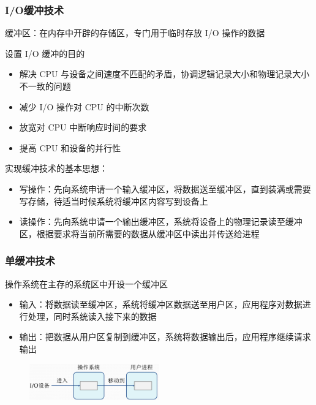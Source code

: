\documentclass[cs4size,a4paper,10pt]{ctexart}
\begin{document}
	\subsubsection{I/O缓冲技术}
	缓冲区：在内存中开辟的存储区，专门用于临时存放 I/O 操作的数据

	设置 I/O 缓冲的目的
	\begin{itemize}
		\item 解决 CPU 与设备之间速度不匹配的矛盾，协调逻辑记录大小和物理记录大小不一致的问题
		\item 减少 I/O 操作对 CPU 的中断次数
		\item 放宽对 CPU 中断响应时间的要求
		\item 提高 CPU 和设备的并行性
	\end{itemize}

	实现缓冲技术的基本思想：
	\begin{itemize}
		\item 写操作：先向系统申请一个输入缓冲区，将数据送至缓冲区，直到装满或需要写存储，待适当时候系统将缓冲区内容写到设备上
		\item 读操作：先向系统申请一个输出缓冲区，系统将设备上的物理记录读至缓冲区，根据要求将当前所需要的数据从缓冲区中读出并传送给进程
	\end{itemize}

	\subsubsection{单缓冲技术}
	操作系统在主存的系统区中开设一个缓冲区
	\begin{itemize}
		\item 输入：将数据读至缓冲区，系统将缓冲区数据送至用户区，应用程序对数据进行处理，同时系统读入接下来的数据
		\item 输出：把数据从用户区复制到缓冲区，系统将数据输出后，应用程序继续请求输出
	\end{itemize}
	\begin{figure}[H]
		\centering
		\includegraphics[width=0.5\textwidth]{img/4.2.4.2}
	\end{figure}
\end{document}
